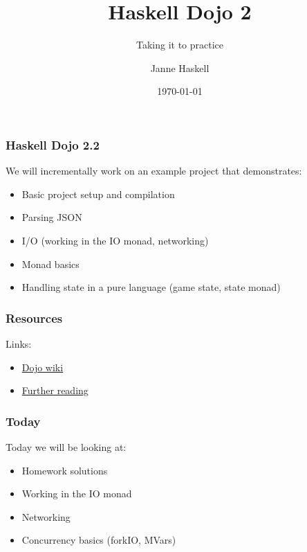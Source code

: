 \documentclass{beamer}
\title{Haskell Dojo 2}
\subtitle{Taking it to practice}
\date{\today}
\author{Janne Haskell}
\begin{document}
\frame{\titlepage}

\begin{frame}[fragile]

\frametitle{Haskell Dojo 2.2}

We will incrementally work on an example project that demonstrates:

\begin{itemize}
  \item Basic project setup and compilation
  \item Parsing JSON
  \item I/O (working in the IO monad, networking)
  \item Monad basics
  \item Handling state in a pure language (game state, state monad)
\end{itemize}

\end{frame}

\begin{frame}[fragile]
\frametitle{Resources}

Links:

\begin{itemize}
  \item \href{https://github.com/nurpax/haskell-dojo/wiki/Haskell-Dojo-\%232}{Dojo wiki}
  \item \href{https://github.com/nurpax/haskell-dojo/wiki/Further-reading}{Further reading}
\end{itemize}

\end{frame}

\begin{frame}[fragile]

\frametitle{Today}

Today we will be looking at:

\begin{itemize}
  \item Homework solutions
  \item Working in the IO monad
  \item Networking
  \item Concurrency basics (forkIO, MVars)
\end{itemize}

\end{frame}
\end{document}
